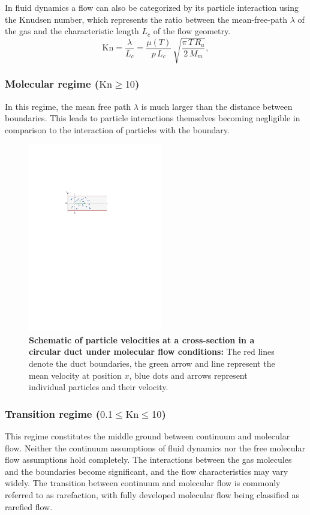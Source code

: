 	In fluid dynamics a flow can also be categorized by its particle interaction using the Knudsen number, which represents the ratio between the mean-free-path $\lambda$ of the gas and the characteristic length $L_c$ of the flow geometry.
	\begin{equation}
		\mathrm{Kn} = \frac{\lambda}{L_c}
		= \frac{\mu(T)}{p\,L_c}\,\sqrt{\frac{\pi\,T\,R_u}{2\,M_m}},
		\label{eq:knudsen-number}
	\end{equation}

\subsubsection*{Molecular regime ($\mathrm{Kn} \geq 10$)}
	In this regime, the mean free path $\lambda$ is much larger than the distance between boundaries.
	This leads to particle interactions themselves becoming negligible in comparison to the interaction of particles with the boundary.
	\begin{figure}[H]
	    \centering
	    \includegraphics[width=0.52\textwidth]{src/02_foundations/fig_molecular-regime.pdf}
		\caption[Schematic of particle velocities at a cross-section in a circular duct under molecular flow conditions.]{
			\textbf{Schematic of particle velocities at a cross-section in a circular duct under molecular flow conditions:}
			The red lines denote the duct boundaries, the green arrow and line represent the mean velocity at position $x$, blue dots and arrows represent individual particles and their velocity.
		}
		\label{fig:molecular-flow}
	\end{figure}

\subsubsection*{Transition regime ($0.1 \leq \mathrm{Kn} \leq 10$)}
	This regime constitutes the middle ground between continuum and molecular flow.
	Neither the continuum assumptions of fluid dynamics nor the free molecular flow assumptions hold completely.
	The interactions between the gas molecules and the boundaries become significant, and the flow characteristics may vary widely.
	The transition between continuum and molecular flow is commonly referred to as rarefaction, with fully developed molecular flow being classified as rarefied flow. 

